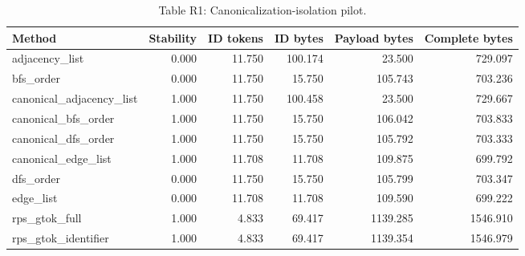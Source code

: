 \begin{table}[t]
\centering
\caption{Table R1: Canonicalization-isolation pilot.}
\begin{tabular}{lrrrrr}
\toprule
Method & Stability & ID tokens & ID bytes & Payload bytes & Complete bytes \\
\midrule
adjacency\_list & 0.000 & 11.750 & 100.174 & 23.500 & 729.097 \\
bfs\_order & 0.000 & 11.750 & 15.750 & 105.743 & 703.236 \\
canonical\_adjacency\_list & 1.000 & 11.750 & 100.458 & 23.500 & 729.667 \\
canonical\_bfs\_order & 1.000 & 11.750 & 15.750 & 106.042 & 703.833 \\
canonical\_dfs\_order & 1.000 & 11.750 & 15.750 & 105.792 & 703.333 \\
canonical\_edge\_list & 1.000 & 11.708 & 11.708 & 109.875 & 699.792 \\
dfs\_order & 0.000 & 11.750 & 15.750 & 105.799 & 703.347 \\
edge\_list & 0.000 & 11.708 & 11.708 & 109.590 & 699.222 \\
rps\_gtok\_full & 1.000 & 4.833 & 69.417 & 1139.285 & 1546.910 \\
rps\_gtok\_identifier & 1.000 & 4.833 & 69.417 & 1139.354 & 1546.979 \\
\bottomrule
\end{tabular}
\end{table}
